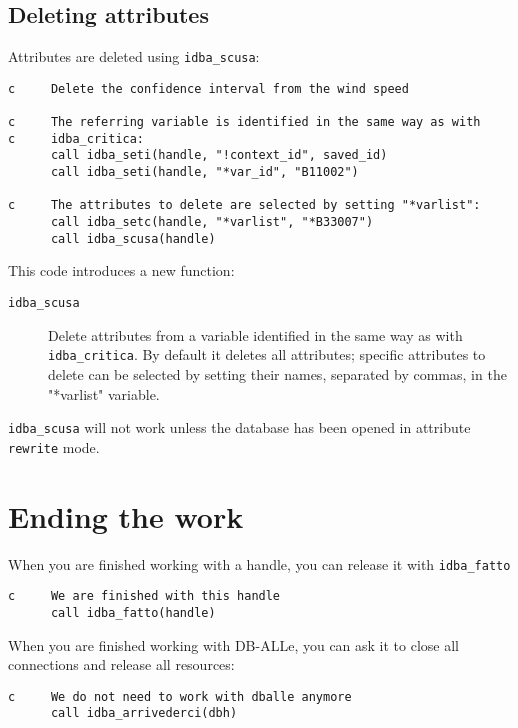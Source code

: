 \documentclass[draft,12pt,a4paper,twoside]{book}
\begin{document}
\subsection{Deleting attributes}

Attributes are deleted using {\tt idba\_scusa}:

\label{fun-idba_scusa}

\begin{verbatim}
c     Delete the confidence interval from the wind speed

c     The referring variable is identified in the same way as with
c     idba_critica:
      call idba_seti(handle, "!context_id", saved_id)
      call idba_seti(handle, "*var_id", "B11002")

c     The attributes to delete are selected by setting "*varlist":
      call idba_setc(handle, "*varlist", "*B33007")
      call idba_scusa(handle)
\end{verbatim}

This code introduces a new function:

\begin{description}
\item[{\tt idba\_scusa}]
  Delete attributes from a variable identified in the same way as with {\tt
  idba\_critica}.  By default it deletes all attributes; specific attributes to
  delete can be selected by setting their names, separated by commas, in the
  "*varlist" variable.
\end{description}

{\tt idba\_scusa} will not work unless the database has been opened in
attribute {\tt rewrite} mode.


\section{Ending the work}

When you are finished working with a handle, you can release it with {\tt idba\_fatto}

\label{fun-idba_fatto}

\begin{verbatim}
c     We are finished with this handle
      call idba_fatto(handle)
\end{verbatim}

When you are finished working with DB-ALLe, you can ask it to close all
connections and release all resources:

\label{fun-idba_arrivederci}

\begin{verbatim}
c     We do not need to work with dballe anymore
      call idba_arrivederci(dbh)
\end{verbatim}
\end{document}
